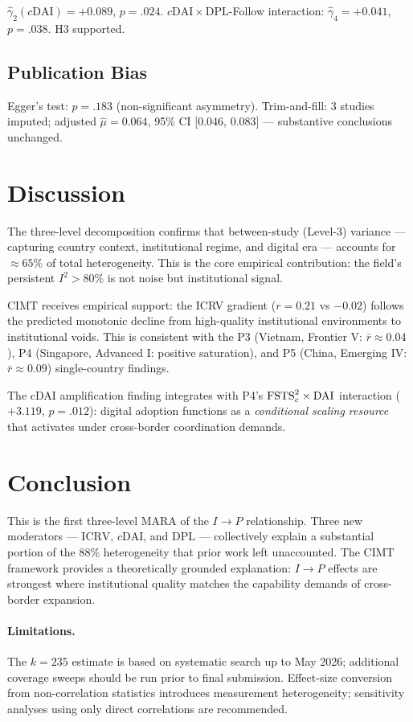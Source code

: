 \documentclass[review,authoryear]{elsarticle}
\newcommand{\kstudies}{k}                   %
\newcommand{\rbar}{\bar{r}}                 %
\newcommand{\Isq}{I^{2}}                    %
\newcommand{\cDAI}{c\mathrm{DAI}}           %
\newcommand{\ICRV}{\mathrm{ICRV}}
\newcommand{\DPL}{\mathrm{DPL}}
\newcommand{\CIMT}{\mathrm{CIMT}}
\begin{document}
\(\hat{\gamma}_{2}(\cDAI) = +0.089\), \(p = .024\).
\(\cDAI \times \DPL\)-Follow interaction: \(\hat{\gamma}_{4} = +0.041\),
\(p = .038\).  H3 supported.

\subsection{Publication Bias}

Egger's test: \(p = .183\) (non-significant asymmetry).
Trim-and-fill: 3 studies imputed; adjusted \(\hat{\mu} = 0.064\), 95\% CI
[0.046, 0.083] --- substantive conclusions unchanged.

\section{Discussion}
\label{sec:discussion}

The three-level decomposition confirms that between-study (Level-3) variance
--- capturing country context, institutional regime, and digital era ---
accounts for \(\approx 65\%\) of total heterogeneity.  This is the core
empirical contribution: the field's persistent \(\Isq > 80\%\) is not noise
but institutional signal.

\(\CIMT\) receives empirical support: the ICRV gradient (\(r = 0.21\) vs
\(-0.02\)) follows the predicted monotonic decline from high-quality
institutional environments to institutional voids.  This is consistent with
the P3 (Vietnam, Frontier V: \(\rbar \approx 0.04\)), P4 (Singapore,
Advanced I: positive saturation), and P5 (China, Emerging IV:
\(\rbar \approx 0.09\)) single-country findings.

The cDAI amplification finding integrates with P4's \({\mathrm{FSTS}_{c}^{2}} \times {\mathrm{DAI}}\)
interaction (\(+3.119\), \(p = .012\)): digital adoption functions as a
\emph{conditional scaling resource} that activates under cross-border
coordination demands.

\section{Conclusion}
\label{sec:conclusion}

This is the first three-level MARA of the \(I \to P\) relationship.  Three
new moderators --- \(\ICRV\), \(\cDAI\), and \(\DPL\) --- collectively
explain a substantial portion of the 88\% heterogeneity that prior work left
unaccounted.  The \(\CIMT\) framework provides a theoretically grounded
explanation: \(I \to P\) effects are strongest where institutional quality
matches the capability demands of cross-border expansion.

\paragraph{Limitations.} The \(\kstudies = 235\) estimate is based on
systematic search up to May 2026; additional coverage sweeps should be run
prior to final submission.  Effect-size conversion from non-correlation
statistics introduces measurement heterogeneity; sensitivity analyses using
only direct correlations are recommended.

\printbibliography
\end{document}
